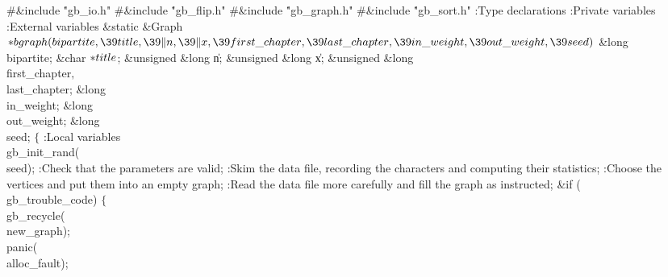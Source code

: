 \Y\B\8\#\&{include} \.{"gb\_io.h"}\6
\8\#\&{include} \.{"gb\_flip.h"}\6
\8\#\&{include} \.{"gb\_graph.h"}\6
\8\#\&{include} \.{"gb\_sort.h"}\6
\ATH\7
:Type declarations\X\6
:Private variables\X\6
:External variables\X\7
\1\1\&{static} \&{Graph} ${}{*}\\{bgraph}(\\{bipartite},\39\\{title},\39\|n,\39%
\|x,\39\\{first\_chapter},\39\\{last\_chapter},\39\\{in\_weight},\39\\{out%
\_weight},\39\\{seed}){}$\6
\&{long} \\{bipartite};\6
\&{char} ${}{*}\\{title}{}$;\6
\&{unsigned} \&{long} \|n;\6
\&{unsigned} \&{long} \|x;\6
\&{unsigned} \&{long} \\{first\_chapter}${},{}$ \\{last\_chapter};\6
\&{long} \\{in\_weight};\6
\&{long} \\{out\_weight};\6
\&{long} \\{seed};\2\2\6
${}\{{}$\5
\1:Local variables\X\7
\\{gb\_init\_rand}(\\{seed});\6
:Check that the parameters are valid\X;\6
:Skim the data file, recording the characters and computing their
statistics\X;\6
:Choose the vertices and put them into an empty graph\X;\6
:Read the data file more carefully and fill the graph as instructed\X;\6
\&{if} (\\{gb\_trouble\_code})\5
${}\{{}$\1\6
\\{gb\_recycle}(\\{new\_graph});\6
\\{panic}(\\{alloc\_fault});\6
